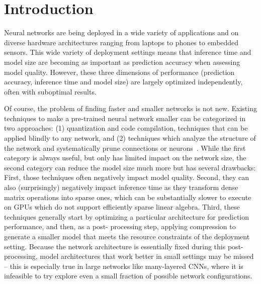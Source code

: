 
\section{Introduction}

Neural networks are being deployed in a wide variety of
applications and on diverse hardware architectures ranging from laptops to
phones to embedded sensors. This wide variety of deployment settings means
that inference time and model size are becoming as important as  prediction
accuracy when assessing model quality.  However, these three dimensions of
performance (prediction accuracy, inference time and model size) are largely
optimized independently, often with suboptimal results.

Of course, the problem of finding faster and smaller networks is not new.
Existing techniques to make a pre-trained neural network smaller can be
categorized in two approaches: (1) quantization \cite{Jouppi:2017:IPA:3079856.3080246} and code
compilation, techniques that can be applied blindly to
any network, and (2) techniques which analyze the structure of the network and
systematically prune connections or neurons~\cite{han2015deepcompression,Cun}. 
While the first category is always useful, but only
has limited impact on the network size, the second category can reduce the model
size much more but has several drawbacks:   First, those techniques often
negatively impact model quality.  Second, they can also (surprisingly) negatively
impact inference time as they transform dense matrix operations into sparse
ones, which can be substantially slower to execute on GPUs which do not support
efficiently sparse linear algebra\cite{han2015deepcompression}. 
Third, these techniques generally start by optimizing a
particular architecture for prediction performance, and then, as a post-
processing step, applying compression  to generate a smaller model that meets
the resource constraints of the deployment setting.  Because the network
architecture is essentially fixed during this post-processing,   model
architectures that work better in small settings may be missed -- this is
especially true in large networks like many-layered CNNs,  where it is
infeasible to try explore even a small fraction of possible network
configurations.


